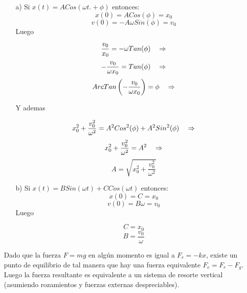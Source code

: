 \documentclass[a4paper]{article}
\begin{document}
     \begin{answer}[Problema 3.]
     
     \begin{enumerate}
\item[a)] Si $x(t) = ACos(\omega t. + \phi)$ entonces:
$$x(0) = ACos(\phi) = x_0$$ 
$$v(0) = -A\omega Sin(\phi) = v_0$$
Luego

$$\frac{v_0}{x_0} = -\omega Tan(\phi)\hspace{0.35cm}\Rightarrow$$
$$-\frac{v_0}{\omega x_0} =  Tan(\phi)\hspace{0.35cm}\Rightarrow$$
$$ArcTan\left(-\frac{v_0}{\omega x_0}\right) =  \phi\hspace{0.35cm}\Rightarrow$$

Y ademas 
 
$$x_0^2 + \frac{v_0^2}{\omega^2} = A^2Cos^2(\phi) + A^2Sin^2(\phi)\hspace{0.35cm}\Rightarrow $$ 
$$x_0^2 + \frac{v_0^2}{\omega^2} = A^2\hspace{0.35cm}\Rightarrow $$ 
$$A = \sqrt{x_0^2 + \frac{v_0^2}{\omega^2}}$$   

\item[b)] Si 
$x(t) = BSin(\omega t) + CCos(\omega t) $ entonces:
$$x(0) = C = x_0$$ 
$$v(0) = B\omega = v_0$$
Luego

$$C = x_0$$
$$B = \frac{v_0}{\omega}$$

\end{enumerate}
     \end{answer}
    \begin{answer}[Problema 4.]
        Dado que la fuerza $F=mg$ en algún momento es igual a $F_r=-kx$, existe un punto de equilibrio de tal manera que hay una fuerza equivalente $F_e = F_r - F_g$. Luego la fuerza resultante es equivalente a un sistema de resorte vertical (asumiendo rozamientos y fuerzas externas despreciables).
    \end{answer}
     
\end{document}
